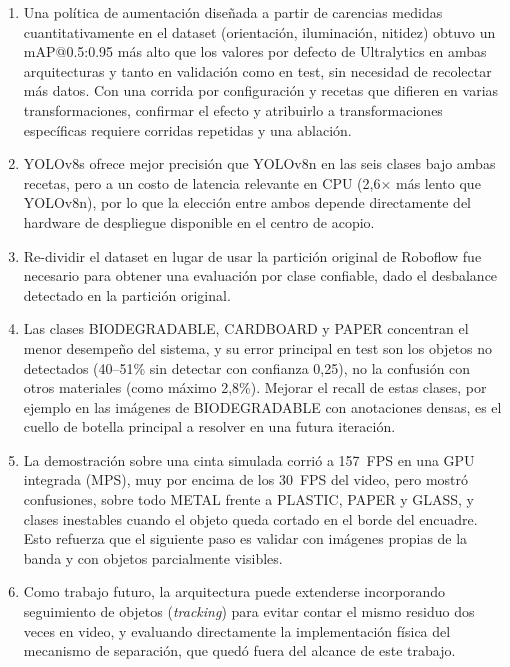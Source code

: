\documentclass[conference]{IEEEtran}
\begin{document}
\begin{enumerate}
\item Una pol\'itica de aumentaci\'on dise\~nada a partir de carencias medidas
cuantitativamente en el dataset (orientaci\'on, iluminaci\'on, nitidez) obtuvo un
mAP@0.5:0.95 m\'as alto que los valores por defecto de Ultralytics en ambas arquitecturas y
tanto en validaci\'on como en test, sin necesidad de recolectar m\'as datos. Con una corrida
por configuraci\'on y recetas que difieren en varias transformaciones, confirmar el efecto y
atribuirlo a transformaciones espec\'ificas requiere corridas repetidas y una ablaci\'on.

\item YOLOv8s ofrece mejor precisi\'on que YOLOv8n en las seis clases bajo ambas recetas, pero
a un costo de latencia relevante en CPU (2,6$\times$ m\'as lento que YOLOv8n), por lo que la
elecci\'on entre ambos depende directamente del hardware de despliegue disponible en el centro
de acopio.

\item Re-dividir el dataset en lugar de usar la partici\'on original de Roboflow fue necesario
para obtener una evaluaci\'on por clase confiable, dado el desbalance detectado en la
partici\'on original.

\item Las clases BIODEGRADABLE, CARDBOARD y PAPER concentran el menor desempe\~no del sistema,
y su error principal en test son los objetos no detectados (40--51\% sin detectar con
confianza 0,25), no la confusi\'on con otros materiales (como m\'aximo 2,8\%). Mejorar el
recall de estas clases, por ejemplo en las im\'agenes de BIODEGRADABLE con anotaciones densas,
es el cuello de botella principal a resolver en una futura iteraci\'on.

\item La demostraci\'on sobre una cinta simulada corri\'o a 157~FPS en una GPU integrada
(MPS), muy por encima de los 30~FPS del video, pero mostr\'o confusiones, sobre todo
METAL frente a PLASTIC, PAPER y GLASS, y clases inestables cuando el objeto queda cortado en el
borde del encuadre. Esto refuerza que el siguiente paso es validar con im\'agenes propias de la
banda y con objetos parcialmente visibles.

\item Como trabajo futuro, la arquitectura puede extenderse incorporando seguimiento de
objetos (\emph{tracking}) para evitar contar el mismo residuo dos veces en video, y evaluando
directamente la implementaci\'on f\'isica del mecanismo de separaci\'on, que qued\'o fuera del
alcance de este trabajo.
\end{enumerate}



\end{document}
